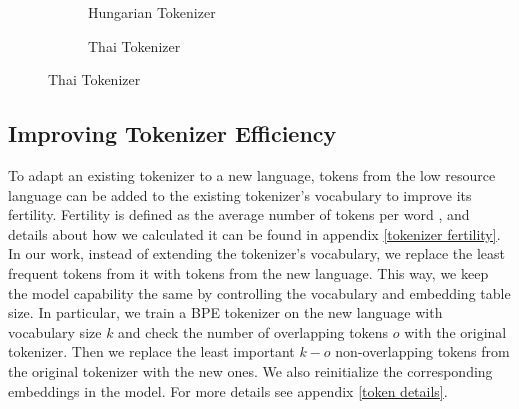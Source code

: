 
\begin{figure}
\label{fig:fertility}
\vspace{-0.2cm}
\centering
\begin{subfigure}[b]{0.48\textwidth}

\vspace{-0.3cm}
\caption{Hungarian Tokenizer}
\end{subfigure}
\hspace{0.2cm}
\begin{subfigure}[b]{0.48\textwidth}

\vspace{-0.3cm}
\caption{Thai Tokenizer}
\end{subfigure}

\vspace{-1.0cm}
\end{figure}

\subsection{Improving Tokenizer Efficiency} \label{token replacement}
To adapt an existing tokenizer to a new language, tokens from the low resource language can be added to the existing tokenizer's vocabulary to improve its fertility. Fertility is defined as the average number of tokens per word \cite{acs2019}, and details about how we calculated it can be found in appendix \ref{tokenizer fertility}. In our work, instead of extending the tokenizer's vocabulary, we replace the least frequent tokens from it with tokens from the new language. This way, we keep the model capability the same by controlling the vocabulary and embedding table size. In particular, we train a BPE tokenizer on the new language with vocabulary size $k$ and check the number of overlapping tokens $o$ with the original tokenizer. Then we replace the least important $k-o$ non-overlapping tokens from the original tokenizer with the new ones. We also reinitialize the corresponding embeddings in the model. For more details see appendix \ref{token details}.

